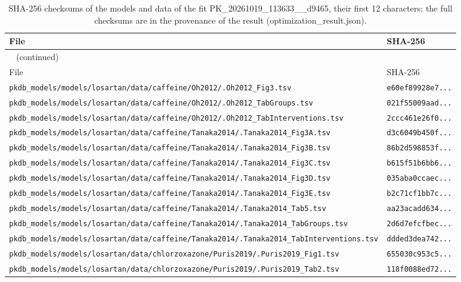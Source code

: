 \begin{longtable}{ll}
\caption{SHA-256 checksums of the models and data of the fit PK\_20261019\_113633\_\_d9465, their first 12 characters; the full checksums are in the provenance of the result (optimization\_result.json).}\label{tab:checksums:PK_20261019_113633__d9465} \\
\toprule
File & SHA-256 \\
\midrule
\endfirsthead
\multicolumn{2}{l}{\small\tablename~\thetable{} (continued)} \\
\toprule
File & SHA-256 \\
\midrule
\endhead
\bottomrule
\endlastfoot
\texttt{pkdb\_models/models/losartan/data/caffeine/Oh2012/.Oh2012\_Fig3.tsv} & \texttt{e60ef89928e7...} \\
\texttt{pkdb\_models/models/losartan/data/caffeine/Oh2012/.Oh2012\_TabGroups.tsv} & \texttt{021f55009aad...} \\
\texttt{pkdb\_models/models/losartan/data/caffeine/Oh2012/.Oh2012\_TabInterventions.tsv} & \texttt{2ccc461e26f0...} \\
\texttt{pkdb\_models/models/losartan/data/caffeine/Tanaka2014/.Tanaka2014\_Fig3A.tsv} & \texttt{d3c6049b450f...} \\
\texttt{pkdb\_models/models/losartan/data/caffeine/Tanaka2014/.Tanaka2014\_Fig3B.tsv} & \texttt{86b2d598853f...} \\
\texttt{pkdb\_models/models/losartan/data/caffeine/Tanaka2014/.Tanaka2014\_Fig3C.tsv} & \texttt{b615f51b6bb6...} \\
\texttt{pkdb\_models/models/losartan/data/caffeine/Tanaka2014/.Tanaka2014\_Fig3D.tsv} & \texttt{035aba0ccaec...} \\
\texttt{pkdb\_models/models/losartan/data/caffeine/Tanaka2014/.Tanaka2014\_Fig3E.tsv} & \texttt{b2c71cf1bb7c...} \\
\texttt{pkdb\_models/models/losartan/data/caffeine/Tanaka2014/.Tanaka2014\_Tab5.tsv} & \texttt{aa23acadd634...} \\
\texttt{pkdb\_models/models/losartan/data/caffeine/Tanaka2014/.Tanaka2014\_TabGroups.tsv} & \texttt{2d6d7efcfbec...} \\
\texttt{pkdb\_models/models/losartan/data/caffeine/Tanaka2014/.Tanaka2014\_TabInterventions.tsv} & \texttt{ddded3dea742...} \\
\texttt{pkdb\_models/models/losartan/data/chlorzoxazone/Puris2019/.Puris2019\_Fig1.tsv} & \texttt{655030c953c5...} \\
\texttt{pkdb\_models/models/losartan/data/chlorzoxazone/Puris2019/.Puris2019\_Tab2.tsv} & \texttt{118f0088ed72...} \\

\end{longtable}
